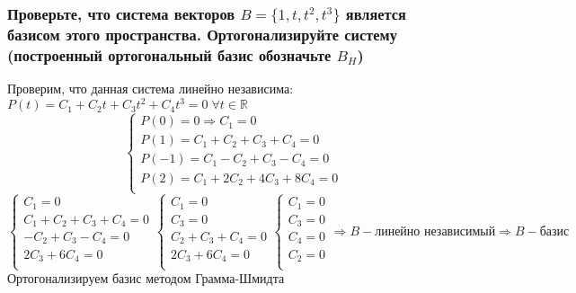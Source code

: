 \documentclass{article}
\begin{document}
    \subsubsection{Проверьте, что система векторов $B = \{1, t, t^2, t^3\}$ является базисом этого пространства.
Ортогонализируйте систему (построенный ортогональный базис обозначьте $B_H$)}
    Проверим, что данная система линейно независима:
    $P(t) =  C_1 + C_2t + C_3t^2 + C_4t^3 = 0 \; \forall t \in \mathbb{R}$\\
    \begin{equation*}
        \begin{cases}
            P(0) = 0 \Rightarrow C_1 = 0 \\
            P(1) = C_1 + C_2 + C_3 + C_4 = 0 \\
            P(-1) = C_1 - C_2 + C_3 - C_4 = 0 \\
            P(2) = C_1 + 2C_2 + 4C_3 + 8C_4 = 0 \\
        \end{cases}
    \end{equation*}
    \begin{equation*}
        \begin{cases}
            C_1 = 0 \\
            C_1 + C_2 + C_3 + C_4 = 0 \\
            - C_2 + C_3 - C_4 = 0 \\
            2C_3 + 6C_4 = 0 \\
        \end{cases}
        \begin{cases}
            C_1 = 0 \\
            C_3 = 0 \\
            C_2 + C_3 + C_4 = 0 \\
            2C_3 + 6C_4 = 0 \\
        \end{cases}
        \begin{cases}
            C_1 = 0 \\
            C_3 = 0 \\
            C_4 = 0 \\
            C_2 = 0 \\
        \end{cases}
        \Rightarrow
        B - \text{линейно независимый}
        \Rightarrow
        B - \text{базис}
    \end{equation*}
    Ортогонализируем базис методом Грамма-Шмидта\\
\end{document}

